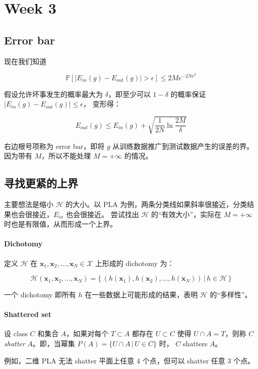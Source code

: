 \documentclass[a4paper]{article}
\begin{document}
\section{Week 3}
\subsection{Error bar}
现在我们知道

$$\mathbb{P}[|E_{in}(g) - E_{out}(g)| > \epsilon] \le 2Me^{-2N\epsilon^2}$$

假设允许坏事发生的概率最大为 $\delta$，即至少可以 $1 - \delta$ 的概率保证 $|E_{in}(g) - E_{out}(g)| \le \epsilon$，
变形得：

$$E_{out}(g) \le E_{in}(g) + \sqrt{\frac{1}{2N}\ln\frac{2M}{\delta}}$$

右边根号项称为 error bar，即将 $g$ 从训练数据推广到测试数据产生的误差的界。因为带有 $M$，所以不能处理 $M = +\infty$ 的情况。

\subsection{寻找更紧的上界}
主要想法是缩小 $\mathcal{H}$ 的大小。以 PLA 为例，两条分类线如果斜率很接近，分类结果也会很接近，$E_{in}$ 也会很接近。
尝试找出 $\mathcal{H}$ 的“有效大小”，实际在 $M = +\infty$ 时也是有限值，从而形成一个上界。

\paragraph{Dichotomy}
定义 $\mathcal{H}$ 在 ${\mathbf{x}_1, \mathbf{x}_2, \dots, \mathbf{x}_N} \in \mathcal{X}$
上形成的 dichotomy 为：

$$\mathcal{H}(\mathbf{x}_1, \mathbf{x}_2, \dots, \mathbf{x}_N) = \{ \, (h(\mathbf{x}_1), h(\mathbf{x}_2), \dots, h(\mathbf{x}_N)) \, | \, h \in \mathcal{H} \, \}$$

一个 dichotomy 即所有 $h$ 在一些数据上可能形成的结果，表明 $\mathcal{H}$ 的“多样性”。

\paragraph{Shattered set}
设 class $C$ 和集合 $A$，如果对每个 $T \subset A$ 都存在 $U \subset C$ 使得
$U \cap A = T$，则称 $C$ \textit{shatter} $A$。即，当幂集 $P(A) = \{U \cap A \, | \, U \in C\}$ 时，
$C$ shatters $A$。

例如，二维 PLA 无法 shatter 平面上任意 4 个点，但可以 shatter 任意 3 个点。
\end{document}
